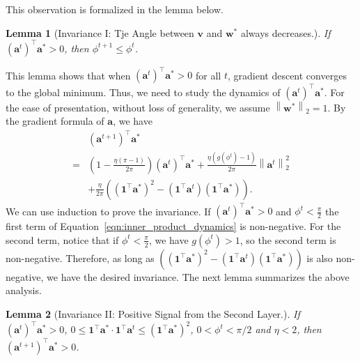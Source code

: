 \documentclass{article}
\newcommand{\firstlayer}{w}
\newcommand{\firstlayerWN}{v}
\newcommand{\secondlayer}{a}
\newcommand{\vect}[1]{\mathbf{#1}}
\newcommand{\norm}[1]{\left\|#1\right\|}
\newtheorem{lem}{Lemma}[section]
\begin{document}
This observation is formalized in the lemma below.
\begin{lem}[Invariance I: Tje Angle between $\vect{\firstlayerWN}$ and $\vect{\firstlayer}^*$ always decreases.]\label{lem:w_angle_converge}
	If $\left(\vect{\secondlayer}^t\right)^\top \vect{\secondlayer}^* > 0$, then $\phi^{t+1} \le \phi^{t}$.
\end{lem}
This lemma shows that when $\left(\vect{\secondlayer}^t\right)^\top \vect{\secondlayer}^* > 0$ for all $t$, gradient descent converges to the global minimum.
Thus, we need to study the dynamics of $\left(\vect{\secondlayer}^t\right)^\top \vect{\secondlayer}^*$.
For the ease of presentation, without loss of generality, we assume $\norm{\vect{\firstlayer}^*}_2= 1$.
By the gradient formula of $\vect{\secondlayer}$, we have \begin{align}
	&\left(\vect{\secondlayer}^{t+1}\right)^\top\vect{\secondlayer}^* \nonumber \\ = &\left(1-\frac{\eta(\pi-1)}{2\pi}\right)\left(\vect{\secondlayer}^t\right)^\top \vect{\secondlayer}^* + \frac{\eta(g(\phi^t)-1)}{2\pi}\norm{\vect{\secondlayer}^t}_2^2 \nonumber\\
	&+ \frac{\eta}{2\pi}\left(\left(\vect{1}^\top \vect{\secondlayer}^*\right)^2 - \left(\vect{1}^\top \vect{\secondlayer}^t\right)\left(\vect{1}^\top \vect{\secondlayer}^*\right)\right). \label{eqn:inner_product_dynamics}
\end{align}
We can use induction to prove the invariance.
If $\left(\vect{\secondlayer}^t\right)^\top \vect{\secondlayer}^* > 0$ and $\phi^t < \frac{\pi}{2}$ the first term of Equation~\eqref{eqn:inner_product_dynamics} is non-negative.
For the second term, notice that if $\phi^t <\frac{\pi}{2}$, we have $g(\phi^t) > 1$, so the second term is non-negative.
Therefore, as long as $\left(\left(\vect{1}^\top \vect{\secondlayer}^*\right)^2 - \left(\vect{1}^\top \vect{\secondlayer}^t\right)\left(\vect{1}^\top \vect{\secondlayer}^*\right)\right)$ is also non-negative, we have the desired invariance.
The next lemma summarizes the above analysis.
\begin{lem}[Invariance II: Positive Signal from the Second Layer.]\label{lem:beta_inner_pos}
	If $\left(\vect{\secondlayer}^t\right)^\top \vect{\secondlayer}^* > 0$, $0\le \vect{1}^\top \vect{\secondlayer}^*\cdot\vect{1}^\top\vect{\secondlayer}^t \le \left(\vect{1}^\top \vect{\secondlayer}^*\right)^2$, $0 < \phi^t <\pi/2 $ and $\eta < 2$, then $\left(\vect{\secondlayer}^{t+1}\right)^\top\vect{\secondlayer}^* > 0$.
\end{lem}
\end{document}
